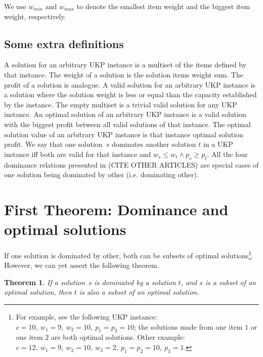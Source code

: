 \documentclass[12pt]{article}
\newtheorem{theorem}{Theorem}
\begin{document}
We use \(w_{min}\) and \(w_{max}\) to denote the smallest item weight and the biggest item weight, respectively.

\subsection{Some extra definitions}

A solution for an arbitrary UKP instance is a multiset of the items defined by that instance. The weight of a solution is the solution items weight sum. The profit of a solution is analogue. A valid solution for an arbitrary UKP instance is a solution where the solution weight is less or equal than the capacity established by the instance. The empty multiset is a trivial valid solution for any UKP instance. An optimal solution of an arbitrary UKP instance is a valid solution with the biggest profit between all valid solutions of that instance. The optimal solution value of an arbitrary UKP instance is that instance optimal solution profit. We say that one solution~\(s\) dominates another solution \(t\) in a UKP instance iff both are valid for that instance and \(w_s \leq w_t \land p_s \geq p_t\). All the four dominance relations presented in (CITE OTHER ARTICLES) are special cases of one solution being dominated by other (i.e. dominating other).

\section{First Theorem: Dominance and optimal solutions}

If one solution is dominated by other, both can be subsets of optimal solutions\footnote{For example, see the following UKP instance: \(c = 10,~w_1 = 9,~w_2 = 10,~p_1 = p_2 = 10\); the solutions made from one item \(1\) or one item \(2\) are both optimal solutions. Other example: \(c = 12,~w_1 = 9,~w_2 = 10,~w_3 = 2,~p_1 = p_2 = 10,~p_3 = 1\).}. However, we can yet assert the following theorem.
\vspace{0.5cm}
\begin{theorem}\label{theo:domination} 
If a solution~\(s\) is dominated by a solution \(t\), and \(s\) is a subset of an optimal solution, then \(t\) is also a subset of an optimal solution.
\end{theorem}
\end{document}
